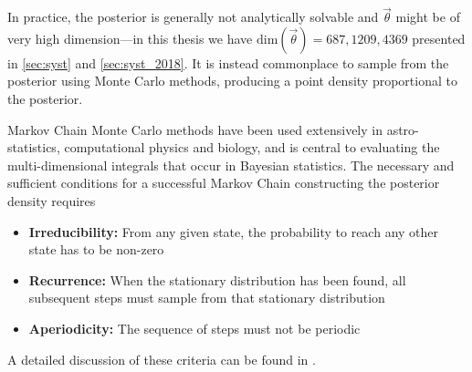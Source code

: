 In practice, the posterior is generally not analytically solvable and $\vec{\theta}$ might be of very high dimension---in this thesis we have $\text{dim}(\vec{\theta})=687, 1209, 4369$ presented in \autoref{sec:syst} and \autoref{sec:syst_2018}. It is instead commonplace to sample from the posterior using Monte Carlo methods\cite{bayesian_tutorial}, producing a point density proportional to the posterior.

Markov Chain Monte Carlo methods have been used extensively in astro-statistics, computational physics and biology, and is central to evaluating the multi-dimensional integrals that occur in Bayesian statistics. The necessary and sufficient conditions for a successful Markov Chain constructing the posterior density requires
\begin{itemize}
	\item \textbf{Irreducibility:} From any given state, the probability to reach any other state has to be non-zero
	\item \textbf{Recurrence:} When the stationary distribution has been found, all subsequent steps must sample from that stationary distribution
	\item \textbf{Aperiodicity:} The sequence of steps must not be periodic
\end{itemize}
A detailed discussion of these criteria can be found in \cite{mcmc_practice, mcmc_handbook}.


